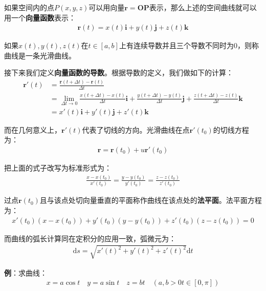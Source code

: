 \documentclass{ctexart}
\let\oldtextbf\textbf %
\renewcommand{\textbf}[1]{\textcolor{btex}{\oldtextbf{#1}}} %
\begin{document}
如果空间内的点$P(x,y,z)$可以用向量$\bm{r}=\bm{OP}$表示，那么上述的空间曲线就可以用一个\textbf{向量函数}表示：
\begin{align*}
    \bm{r}(t)=x(t)\bm{i}+y(t)\bm{j}+z(t)\bm{k}\tag{6-25}
\end{align*}

如果$x(t),y(t),z(t)$在$t\in[a,b]$上有连续导数并且三个导数不同时为0，则称曲线是一条光滑曲线。

接下来我们定义\textbf{向量函数的导数}。根据导数的定义，我们做如下的计算：
\begin{align*}
\bm{r}'(t)&=\frac{\bm{r}(t+\Delta t)-\bm{r}(t)}{\Delta t}\\
&=\lim_{\Delta t\to 0}\frac{x(t+\Delta t)-x(t)}{\Delta t}\bm{i}+
\frac{y(t+\Delta t)-y(t)}{\Delta t}\bm{j}  +\frac{z(t+\Delta t)-z(t)}{\Delta t}\bm{k}\\
&=x'(t)\bm{i}+y'(t)\bm{j}+z'(t)\bm{k}\tag{6-26} 
\end{align*}

而在几何意义上，$\bm{r}'(t)$代表了切线的方向。光滑曲线在点$\bm{r}'(t_0)$的切线方程为：
\begin{align*}
    \bm{r}=\bm{r}(t_0)+u\bm{r'}(t_0)
\end{align*}

\begin{tcolorbox}[
    colback=bac1,     %
    colframe=fra1,   %
    coltitle=white,             %
    coltext=tex1,
    title=曲线切线方程,
    fonttitle=\bfseries,        %
arc=3mm,                     %
breakable
]
把上面的式子改写为标准形式为：
\begin{align*}
    \frac{x-x(t_0)}{x'(t_0)}=\frac{y-y(t_0)}{y'(t_0)}=\frac{z-z(t_0)}{z'(t_0)}\tag{6-27}
\end{align*}
\end{tcolorbox}

过点$\bm{r}(t_0)$且与该点处切向量垂直的平面称作曲线在该点处的\textbf{法平面}。法平面方程为：
\begin{align*}
    x'(t_0)(x-x(t_0))+y'(t_0)(y-y(t_0))+z'(t_0)(z-z(t_0))=0\tag{6-28}
\end{align*}

而曲线的弧长计算同在定积分的应用一致，弧微元为：
\begin{align*}
    \mathrm{d}s=\sqrt{x'(t)^2+y'(t)^2+z'(t)^2}\mathrm{d}t\tag{6-29}
\end{align*}


\textbf{例}：求曲线：
\begin{align*}
    x=a\cos t\quad y=a\sin t\quad z=bt \quad(a,b>0t\in[0,\pi])
\end{align*}
\end{document}
